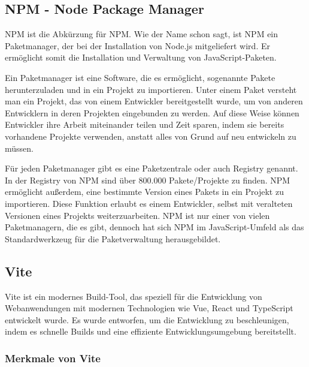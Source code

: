\subsection{NPM - Node Package Manager}
\label{chapter:3-werkzeuge-npm}

\acs{NPM} ist die Abkürzung für \acf{NPM}. Wie der Name schon sagt, ist NPM ein Paketmanager, der bei der Installation von Node.js mitgeliefert wird. Er ermöglicht somit die Installation und Verwaltung von JavaScript-Paketen.

Ein Paketmanager ist eine Software, die es ermöglicht, sogenannte Pakete herunterzuladen und in ein Projekt zu importieren. Unter einem Paket versteht man ein Projekt, das von einem Entwickler bereitgestellt wurde, um von anderen Entwicklern in deren Projekten eingebunden zu werden. Auf diese Weise können Entwickler ihre Arbeit miteinander teilen und Zeit sparen, indem sie bereits vorhandene Projekte verwenden, anstatt alles von Grund auf neu entwickeln zu müssen.

Für jeden Paketmanager gibt es eine Paketzentrale oder auch Registry genannt. In der Registry von \acs{NPM} sind über 800.000 Pakete/Projekte zu finden. \acs{NPM} ermöglicht außerdem, eine bestimmte Version eines Pakets in ein Projekt zu importieren. Diese Funktion erlaubt es einem Entwickler, selbst mit veralteten Versionen eines Projekts weiterzuarbeiten. \acs{NPM} ist nur einer von vielen Paketmanagern, die es gibt, dennoch hat sich \acs{NPM} im JavaScript-Umfeld als das Standardwerkzeug für die Paketverwaltung herausgebildet.\cite{npm}

\subsection{Vite}

Vite ist ein modernes Build-Tool, das speziell für die Entwicklung von Webanwendungen mit modernen Technologien wie Vue, React und TypeScript entwickelt wurde. Es wurde entworfen, um die Entwicklung zu beschleunigen, indem es schnelle Builds und eine effiziente Entwicklungsumgebung bereitstellt. \cite{vitejs}

\subsubsection{Merkmale von Vite}

